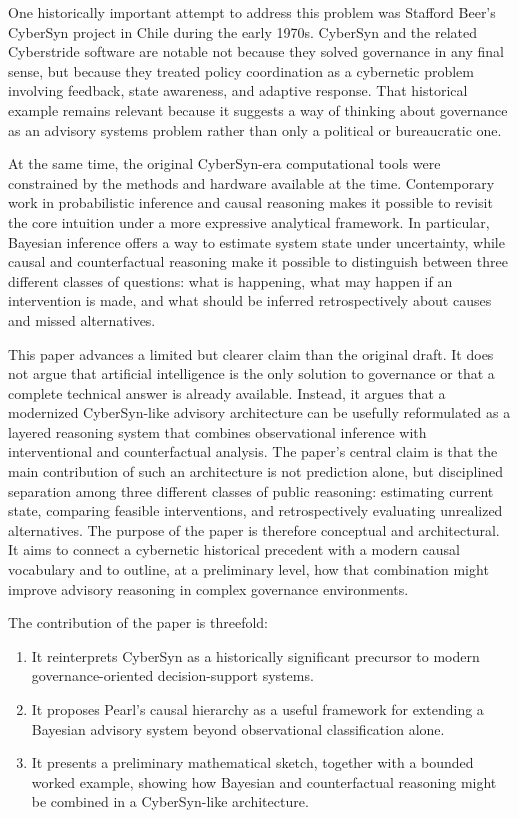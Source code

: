 \documentclass[11pt]{article}
\begin{document}
One historically important attempt to address this problem was Stafford Beer's CyberSyn project in Chile during the early 1970s. CyberSyn and the related Cyberstride software are notable not because they solved governance in any final sense, but because they treated policy coordination as a cybernetic problem involving feedback, state awareness, and adaptive response. That historical example remains relevant because it suggests a way of thinking about governance as an advisory systems problem rather than only a political or bureaucratic one.

At the same time, the original CyberSyn-era computational tools were constrained by the methods and hardware available at the time. Contemporary work in probabilistic inference and causal reasoning makes it possible to revisit the core intuition under a more expressive analytical framework. In particular, Bayesian inference offers a way to estimate system state under uncertainty, while causal and counterfactual reasoning make it possible to distinguish between three different classes of questions: what is happening, what may happen if an intervention is made, and what should be inferred retrospectively about causes and missed alternatives.

This paper advances a limited but clearer claim than the original draft. It does not argue that artificial intelligence is the only solution to governance or that a complete technical answer is already available. Instead, it argues that a modernized CyberSyn-like advisory architecture can be usefully reformulated as a layered reasoning system that combines observational inference with interventional and counterfactual analysis. The paper's central claim is that the main contribution of such an architecture is not prediction alone, but disciplined separation among three different classes of public reasoning: estimating current state, comparing feasible interventions, and retrospectively evaluating unrealized alternatives. The purpose of the paper is therefore conceptual and architectural. It aims to connect a cybernetic historical precedent with a modern causal vocabulary and to outline, at a preliminary level, how that combination might improve advisory reasoning in complex governance environments.

The contribution of the paper is threefold:
\begin{enumerate}
\item It reinterprets CyberSyn as a historically significant precursor to modern governance-oriented decision-support systems.
\item It proposes Pearl's causal hierarchy as a useful framework for extending a Bayesian advisory system beyond observational classification alone.
\item It presents a preliminary mathematical sketch, together with a bounded worked example, showing how Bayesian and counterfactual reasoning might be combined in a CyberSyn-like architecture.
\end{enumerate}
\end{document}

